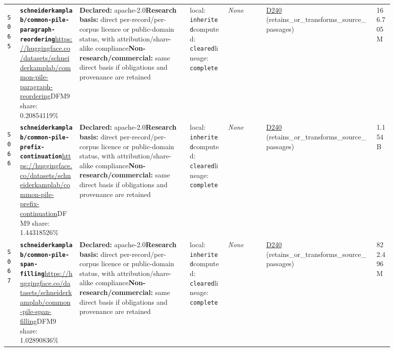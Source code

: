 \documentclass[9pt,a4paper]{article}
\newcommand{\srcid}[1]{\hypertarget{src:#1}{\texttt{#1}}}
\begin{document}
\begin{landscape}
\begin{longtable}{@{}L{0.03\linewidth}L{0.14\linewidth}L{0.26\linewidth}L{0.09\linewidth}L{0.09\linewidth}L{0.265\linewidth}L{0.045\linewidth}@{}}
\srcid{S065} & \textbf{\nolinkurl{schneiderkamplab/common-pile-paragraph-reordering}}\newline \url{https://huggingface.co/datasets/schneiderkamplab/common-pile-paragraph-reordering}\newline DFM9 share: 0.20854119\% & \textbf{Declared:} apache-2.0\newline \textbf{Research basis:} direct per-record/per-corpus licence or public-domain status, with attribution/share-alike compliance\newline \textbf{Non-research/commercial:} same direct basis if obligations and provenance are retained & local: \texttt{inherited}\newline computed: \texttt{cleared}\newline lineage: \texttt{complete} & \textit{None} & \hyperlink{dep:D240}{D240} (retains\_or\_transforms\_source\_passages) & 166.705M \\
\srcid{S066} & \textbf{\nolinkurl{schneiderkamplab/common-pile-prefix-continuation}}\newline \url{https://huggingface.co/datasets/schneiderkamplab/common-pile-prefix-continuation}\newline DFM9 share: 1.44318526\% & \textbf{Declared:} apache-2.0\newline \textbf{Research basis:} direct per-record/per-corpus licence or public-domain status, with attribution/share-alike compliance\newline \textbf{Non-research/commercial:} same direct basis if obligations and provenance are retained & local: \texttt{inherited}\newline computed: \texttt{cleared}\newline lineage: \texttt{complete} & \textit{None} & \hyperlink{dep:D240}{D240} (retains\_or\_transforms\_source\_passages) & 1.154B \\
\srcid{S067} & \textbf{\nolinkurl{schneiderkamplab/common-pile-span-filling}}\newline \url{https://huggingface.co/datasets/schneiderkamplab/common-pile-span-filling}\newline DFM9 share: 1.02890836\% & \textbf{Declared:} apache-2.0\newline \textbf{Research basis:} direct per-record/per-corpus licence or public-domain status, with attribution/share-alike compliance\newline \textbf{Non-research/commercial:} same direct basis if obligations and provenance are retained & local: \texttt{inherited}\newline computed: \texttt{cleared}\newline lineage: \texttt{complete} & \textit{None} & \hyperlink{dep:D240}{D240} (retains\_or\_transforms\_source\_passages) & 822.496M \\

\end{longtable}
\end{landscape}
\end{document}
